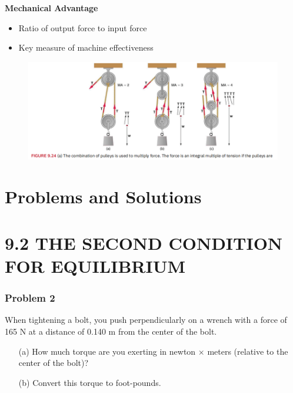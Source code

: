 \documentclass{beamer}
\begin{document}
\begin{frame}
    \item \textbf{Mechanical Advantage}
    \begin{itemize}
        \item Ratio of output force to input force
        \item Key measure of machine effectiveness
    \end{itemize}
\begin{figure}[H]
    \centering
    \includegraphics[width=1\linewidth]{CH9/Screenshot 2024-11-04 120504.png}
\end{figure}
    
\end{frame}

\section{Problems and Solutions}

\section{9.2 THE SECOND CONDITION FOR EQUILIBRIUM}

\begin{frame}
\frametitle{Problem 2}
When tightening a bolt, you push perpendicularly on a wrench with a force of 165 N at a distance of 0.140 m from the center of the bolt.
\begin{itemize}
    \item[(a)] How much torque are you exerting in newton $\times$ meters (relative to the center of the bolt)?
    \item[(b)] Convert this torque to foot-pounds.
\end{itemize}
\end{frame}
\end{document}
